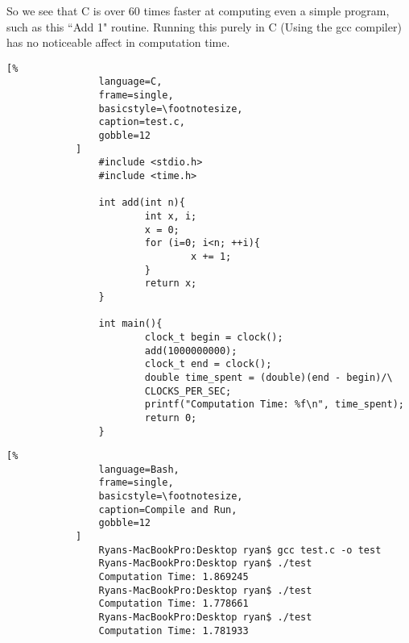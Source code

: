 \documentclass[crop=false,class=article,oneside]{standalone}
\begin{document}
            So we see that C is over 60 times faster at computing even a simple program, such as this ``Add 1" routine.
            Running this purely in C (Using the gcc compiler) has no
            noticeable affect in computation time.
            \begin{lstlisting}[%
                language=C,
                frame=single,
                basicstyle=\footnotesize,
                caption=test.c,
                gobble=12
            ]
                #include <stdio.h>
                #include <time.h>
                
                int add(int n){
                        int x, i;
                        x = 0;
                        for (i=0; i<n; ++i){
                                x += 1;
                        }
                        return x;
                }
                
                int main(){
                        clock_t begin = clock();
                        add(1000000000);
                        clock_t end = clock();
                        double time_spent = (double)(end - begin)/\
                        CLOCKS_PER_SEC;
                        printf("Computation Time: %f\n", time_spent);
                        return 0;
                }
            \end{lstlisting}
            \newpage
            \begin{lstlisting}[%
                language=Bash,
                frame=single,
                basicstyle=\footnotesize,
                caption=Compile and Run,
                gobble=12
            ]
                Ryans-MacBookPro:Desktop ryan$ gcc test.c -o test
                Ryans-MacBookPro:Desktop ryan$ ./test
                Computation Time: 1.869245
                Ryans-MacBookPro:Desktop ryan$ ./test
                Computation Time: 1.778661
                Ryans-MacBookPro:Desktop ryan$ ./test
                Computation Time: 1.781933
            \end{lstlisting}
\end{document}
